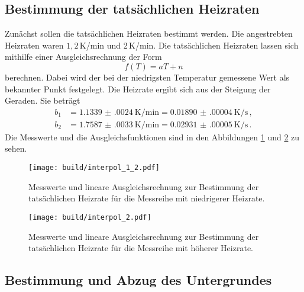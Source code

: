 \subsection{Bestimmung der tatsächlichen Heizraten}
Zunächst sollen die tatsächlichen Heizraten bestimmt werden. Die angestrebten
Heizraten waren $1{,}2\,$K/min und 2\,K/min. Die tatsächlichen Heizraten lassen
sich mithilfe einer Ausgleichsrechnung der Form
\begin{equation*}
  f(T)=aT+n
\end{equation*}
berechnen. Dabei wird der bei der niedrigsten Temperatur gemessene Wert als bekannter
Punkt festgelegt. Die Heizrate ergibt sich aus der Steigung der Geraden. Sie beträgt
\begin{align*}
  b_1&=\SI{1.1339(0024)}{\kelvin\per\minute}= \SI{0.01890(00004)}{\kelvin\per\second}\,, \\
  b_2&=\SI{1.7587(0033)}{\kelvin\per\minute}= \SI{0.02931(00005)}{\kelvin\per\second}\,.
\end{align*}
Die Messwerte und die Ausgleichsfunktionen sind in den Abbildungen \ref{fig:heiz1}
und \ref{fig:heiz2} zu sehen.

\begin{figure}
  \centering
  \texttt{[image: build/interpol\_1\_2.pdf]}
  \caption{Messwerte und lineare Ausgleichsrechnung zur Bestimmung der tatsächlichen
  Heizrate für die Messreihe mit niedrigerer Heizrate.}
  \label{fig:heiz1}
\end{figure}
\begin{figure}
  \centering
  \texttt{[image: build/interpol\_2.pdf]}
  \caption{Messwerte und lineare Ausgleichsrechnung zur Bestimmung der tatsächlichen
  Heizrate für die Messreihe mit höherer Heizrate.}
  \label{fig:heiz2}
\end{figure}


\subsection{Bestimmung und Abzug des Untergrundes}
\label{sec:untergrund}


